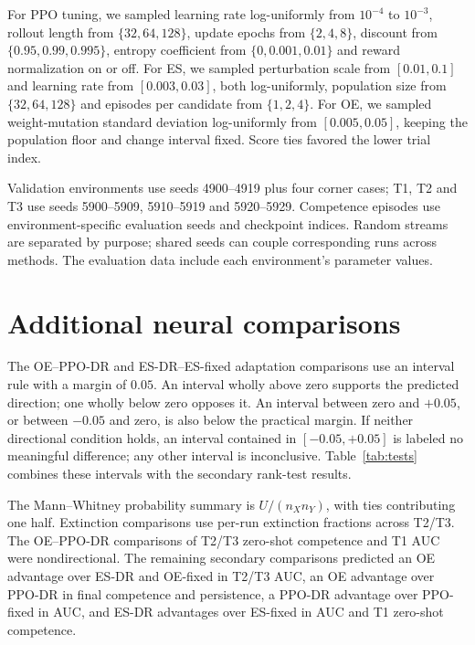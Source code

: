 

For PPO tuning, we sampled learning rate log-uniformly from $10^{-4}$ to $10^{-3}$, rollout length from $\{32,64,128\}$, update epochs from $\{2,4,8\}$, discount from $\{0.95,0.99,0.995\}$, entropy coefficient from $\{0,0.001,0.01\}$ and reward normalization on or off. For ES, we sampled perturbation scale from $[0.01,0.1]$ and learning rate from $[0.003,0.03]$, both log-uniformly, population size from $\{32,64,128\}$ and episodes per candidate from $\{1,2,4\}$. For OE, we sampled weight-mutation standard deviation log-uniformly from $[0.005,0.05]$, keeping the population floor and change interval fixed. Score ties favored the lower trial index.

Validation environments use seeds 4900--4919 plus four corner cases; T1, T2 and T3 use seeds 5900--5909, 5910--5919 and 5920--5929. Competence episodes use environment-specific evaluation seeds and checkpoint indices. Random streams are separated by purpose; shared seeds can couple corresponding runs across methods. The evaluation data include each environment's parameter values.

\section{Additional neural comparisons}
\label{app:inference}
The OE--PPO-DR and ES-DR--ES-fixed adaptation comparisons use an interval rule with a margin of $0.05$. An interval wholly above zero supports the predicted direction; one wholly below zero opposes it. An interval between zero and $+0.05$, or between $-0.05$ and zero, is also below the practical margin. If neither directional condition holds, an interval contained in $[-0.05,+0.05]$ is labeled no meaningful difference; any other interval is inconclusive. Table~\ref{tab:tests} combines these intervals with the secondary rank-test results.



The Mann--Whitney probability summary is $U/(n_Xn_Y)$, with ties contributing one half. Extinction comparisons use per-run extinction fractions across T2/T3. The OE--PPO-DR comparisons of T2/T3 zero-shot competence and T1 AUC were nondirectional. The remaining secondary comparisons predicted an OE advantage over ES-DR and OE-fixed in T2/T3 AUC, an OE advantage over PPO-DR in final competence and persistence, a PPO-DR advantage over PPO-fixed in AUC, and ES-DR advantages over ES-fixed in AUC and T1 zero-shot competence.

